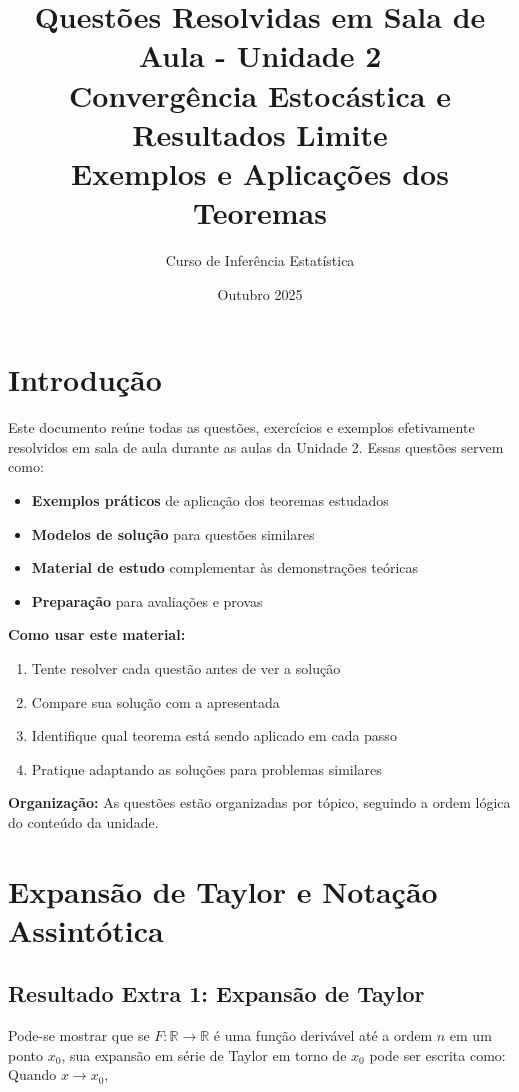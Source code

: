 \documentclass[12pt,a4paper]{article}
\title{Questões Resolvidas em Sala de Aula - Unidade 2\\
\large Convergência Estocástica e Resultados Limite\\
\normalsize Exemplos e Aplicações dos Teoremas}
\author{Curso de Inferência Estatística}
\date{Outubro 2025}
\theoremstyle{definition}
\theoremstyle{remark}
\begin{document}
\maketitle
\tableofcontents
\newpage

\section{Introdução}

Este documento reúne todas as questões, exercícios e exemplos efetivamente resolvidos em sala de aula durante as aulas da Unidade 2. Essas questões servem como:

\begin{itemize}
    \item \textbf{Exemplos práticos} de aplicação dos teoremas estudados
    \item \textbf{Modelos de solução} para questões similares
    \item \textbf{Material de estudo} complementar às demonstrações teóricas
    \item \textbf{Preparação} para avaliações e provas
\end{itemize}

\textbf{Como usar este material:}
\begin{enumerate}
    \item Tente resolver cada questão antes de ver a solução
    \item Compare sua solução com a apresentada
    \item Identifique qual teorema está sendo aplicado em cada passo
    \item Pratique adaptando as soluções para problemas similares
\end{enumerate}

\textbf{Organização:} As questões estão organizadas por tópico, seguindo a ordem lógica do conteúdo da unidade.

\section{Expansão de Taylor e Notação Assintótica}

\subsection{Resultado Extra 1: Expansão de Taylor}

Pode-se mostrar que se $F: \mathbb{R} \to \mathbb{R}$ é uma função derivável até a ordem $n$ em um ponto $x_0$, sua expansão em série de Taylor em torno de $x_0$ pode ser escrita como: Quando $x \to x_0$,
\end{document}
